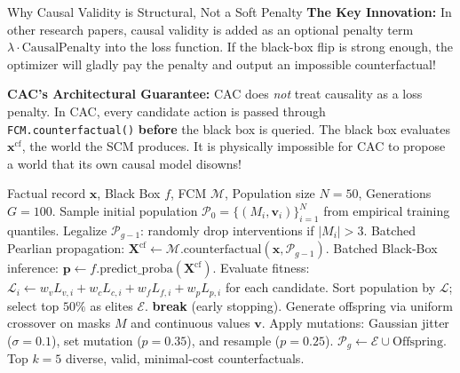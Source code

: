 \documentclass[11pt,a4paper]{article}
\begin{document}
\begin{childbranch}{Why Causal Validity is Structural, Not a Soft Penalty}
\textbf{The Key Innovation:}
In other research papers, causal validity is added as an optional penalty term $\lambda \cdot \text{CausalPenalty}$ into the loss function. If the black-box flip is strong enough, the optimizer will gladly pay the penalty and output an impossible counterfactual!

\medskip\noindent
\textbf{CAC's Architectural Guarantee:}
CAC does \emph{not} treat causality as a loss penalty. In CAC, every candidate action is passed through \texttt{FCM.counterfactual()} \textbf{before} the black box is queried. The black box evaluates $\mathbf{x}^{\text{cf}}$, the world the SCM produces. It is physically impossible for CAC to propose a world that its own causal model disowns!
\end{childbranch}

\begin{algorithm}[htbp]
\caption{The CAC Evolutionary Recourse Optimization Loop}
\label{alg:cac}
\begin{algorithmic}[1]
\Require Factual record $\mathbf{x}$, Black Box $f$, FCM $\mathcal{M}$, Population size $N=50$, Generations $G=100$.
\State Sample initial population $\mathcal{P}_0 = \{(M_i, \mathbf{v}_i)\}_{i=1}^N$ from empirical training quantiles.
    \State Legalize $\mathcal{P}_{g-1}$: randomly drop interventions if $|M_i| > 3$.
    \State Batched Pearlian propagation: $\mathbf{X}^{\text{cf}} \gets \mathcal{M}.\text{counterfactual}(\mathbf{x}, \mathcal{P}_{g-1})$.
    \State Batched Black-Box inference: $\mathbf{p} \gets f.\text{predict\_proba}(\mathbf{X}^{\text{cf}})$.
    \State Evaluate fitness: $\mathcal{L}_i \gets w_v L_{v,i} + w_c L_{c,i} + w_f L_{f,i} + w_p L_{p,i}$ for each candidate.
    \State Sort population by $\mathcal{L}$; select top $50\%$ as elites $\mathcal{E}$.
        \State \textbf{break} (early stopping).
    \EndIf
    \State Generate offspring via uniform crossover on masks $M$ and continuous values $\mathbf{v}$.
    \State Apply mutations: Gaussian jitter ($\sigma = 0.1$), set mutation ($p=0.35$), and resample ($p=0.25$).
    \State $\mathcal{P}_g \gets \mathcal{E} \cup \text{Offspring}$.
\EndFor
\State \Return Top $k=5$ diverse, valid, minimal-cost counterfactuals.
\end{algorithmic}
\end{algorithm}
\end{document}
